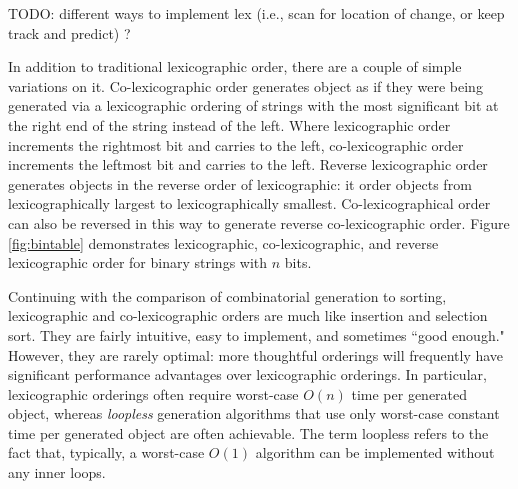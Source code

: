 TODO: different ways to implement lex (i.e., scan for location of change, or keep track and predict) ? 

In addition to traditional lexicographic order, there are a couple of simple variations on it. Co-lexicographic order generates object as if they were being generated via a lexicographic ordering of strings with the most significant bit at the right end of the string instead of the left.  Where lexicographic order increments the rightmost bit and carries to the left, co-lexicographic order increments the leftmost bit and carries to the left. Reverse lexicographic order generates objects in the reverse order of lexicographic: it order objects from lexicographically largest to lexicographically smallest. Co-lexicographical order can also be reversed in this way to generate reverse co-lexicographic order. Figure \ref{fig:bintable} demonstrates lexicographic, co-lexicographic, and reverse lexicographic order for binary strings with $n$ bits.

Continuing with the comparison of combinatorial generation to sorting, lexicographic and co-lexicographic orders are much like insertion and selection sort.  They are fairly intuitive, easy to implement, and sometimes ``good enough."  However, they are rarely optimal: more thoughtful orderings will frequently have significant performance advantages over lexicographic orderings. In particular, lexicographic orderings often require worst-case $O(n)$ time per generated object, whereas \emph{loopless} generation algorithms that use only worst-case constant time per generated object are often achievable. The term loopless refers to the fact that, typically, a worst-case $O(1)$ algorithm can be implemented without any inner loops.

